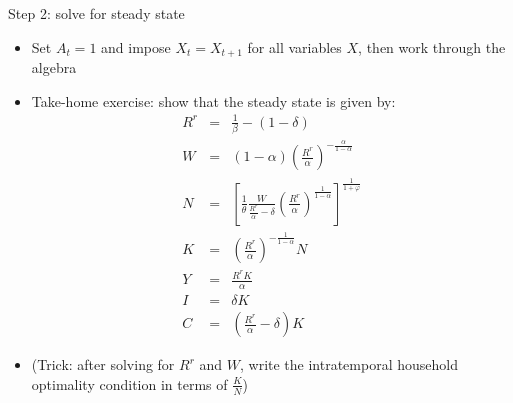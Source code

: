 \documentclass[9pt,xcolor={dvipsnames}]{beamer}
\newcommand{\bit}{\begin{itemize}}
\newcommand{\eit}{\end{itemize}}
\begin{document}
\begin{frame}{Step 2: solve for steady state}

\bit
\setlength\itemsep{1em}

\item Set $A_t=1$ and impose $X_t=X_{t+1}$ for all variables $X$, then work through the algebra

\item Take-home exercise: show that the steady state is given by:
\begin{eqnarray}
R^{r} &=& \frac{1}{\beta}-(1-\delta) \nonumber \\
W &=& (1-\alpha)\left(\frac{R^{r}}{\alpha}\right)^{-\frac{\alpha}{1-\alpha}} \nonumber \\
N &=& \left[\frac{1}{\theta} \frac{W}{\frac{R^{r}}{\alpha}-\delta}\left(\frac{R^{r}}{\alpha
}\right)^{\frac{1}{1-\alpha}}   \right]^{\frac{1}{1+\varphi}} \nonumber \\
K &=& \left(\frac{R^{r}}{\alpha
}\right)^{-\frac{1}{1-\alpha}}N \nonumber \\
Y &=& \frac{R^{r}K}{\alpha} \nonumber \\
I &=& \delta K \nonumber \\
C &=& (\frac{R^{r}}{\alpha}-\delta) K \nonumber
\end{eqnarray}

\item (Trick: after solving for $R^{r}$ and $W$, write the intratemporal household optimality condition in terms of $\frac{K}{N}$)

\eit

\end{frame}
\end{document}
